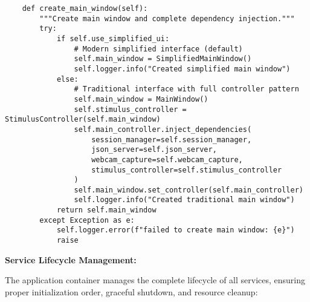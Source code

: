 \documentclass[12pt,a4paper]{article}
\begin{document}
\begin{verbatim}
    def create_main_window(self):
        """Create main window and complete dependency injection."""
        try:
            if self.use_simplified_ui:
                # Modern simplified interface (default)
                self.main_window = SimplifiedMainWindow()
                self.logger.info("Created simplified main window")
            else:
                # Traditional interface with full controller pattern
                self.main_window = MainWindow()
                self.stimulus_controller = StimulusController(self.main_window)
                self.main_controller.inject_dependencies(
                    session_manager=self.session_manager,
                    json_server=self.json_server,
                    webcam_capture=self.webcam_capture,
                    stimulus_controller=self.stimulus_controller
                )
                self.main_window.set_controller(self.main_controller)
                self.logger.info("Created traditional main window")
            return self.main_window
        except Exception as e:
            self.logger.error(f"failed to create main window: {e}")
            raise
\end{verbatim}

\textbf{Service Lifecycle Management:}

The application container manages the complete lifecycle of all services, ensuring proper initialization order, graceful
shutdown, and resource cleanup:
\end{document}
